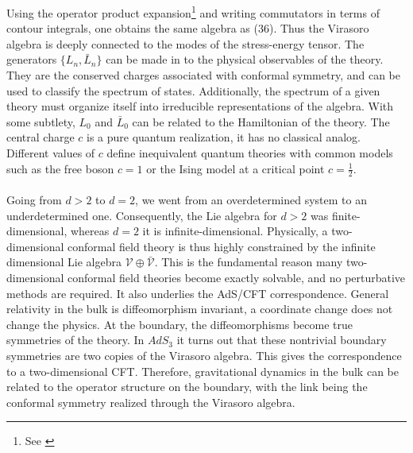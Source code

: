 \documentclass{article}
\begin{document}
Using the operator product expansion\footnote{See \cite{difrancesco1997}} and writing commutators in terms of contour integrals, one obtains the same algebra as (36). Thus the Virasoro algebra is deeply connected to the modes of the stress-energy tensor. The generators $\{L_n,\bar{L}_n\}$ can be made in to the physical observables of the theory. They are the conserved charges associated with conformal symmetry, and can be used to classify the spectrum of states. Additionally, the spectrum of a given theory must organize itself into irreducible representations of the algebra. With some subtlety, $L_0$ and $\bar{L}_0$ can be related to the Hamiltonian of the theory. The central charge $c$ is a pure quantum realization, it has no classical analog. Different values of $c$ define inequivalent quantum theories with common models such as the free boson $c=1$ or the Ising model at a critical point $c = \frac{1}{2}$. \\\\
Going from $d > 2$ to $ d = 2$, we went from an overdetermined system to an underdetermined one. Consequently, the Lie algebra for $d > 2$ was finite-dimensional, whereas $ d = 2$ it is infinite-dimensional. Physically, a two-dimensional conformal field theory is thus highly constrained by the infinite dimensional Lie algebra $\mathcal{V}\oplus\bar{\mathcal{V}}$. This is the fundamental reason many two-dimensional conformal field theories become exactly solvable, and no perturbative methods are required. It also underlies the AdS/CFT correspondence. General relativity in the bulk is diffeomorphism invariant, a coordinate change does not change the physics. At the boundary, the diffeomorphisms become true symmetries of the theory. In $AdS_3$ it turns out that these nontrivial boundary symmetries are two copies of the Virasoro algebra. This gives the correspondence to a two-dimensional CFT. Therefore, gravitational dynamics in the bulk can be related to the operator structure on the boundary, with the link being the conformal symmetry realized through the Virasoro algebra. 
\end{document}
